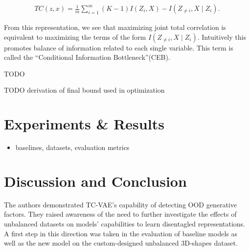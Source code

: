 \documentclass[twoside,11pt]{article}
\begin{document}
\begin{proposition}
  \begin{align*}
    TC(z, x) = \frac{1}{m}\sum_{i=1}^{m}(K-1)I(Z_{i}, X) - I(Z_{\neq i}, X \mid Z_{i}).
  \end{align*}
\end{proposition}
From this representation, we see that maximizing joint total correlation is equivalent to maximizing the terms of the form $I(Z_{\neq i}, X \mid Z_{i})$. Intuitively this promotes balance of information related to each single variable. This term is called the \enquote{Conditional Information Bottleneck}(CEB).

\begin{remark}
  TODO
\end{remark}

\begin{definition}
  TODO derivation of final bound used in optimization
\end{definition}


\section{Experiments \& Results}
\begin{itemize}
  \item baselines, datasets, evaluation metrics
\end{itemize}

\section{Discussion and Conclusion}
The authors demonstrated TC-VAE's capability of detecting OOD generative factors. They raised awareness of the need to further investigate the effects of unbalanced datasets on models' capabilities to learn disentagled representations.
A first step in this direction was taken in the evaluation of baseline models as well as the new model on the custom-designed unbalanced 3D-shapes dataset.




\end{document}
